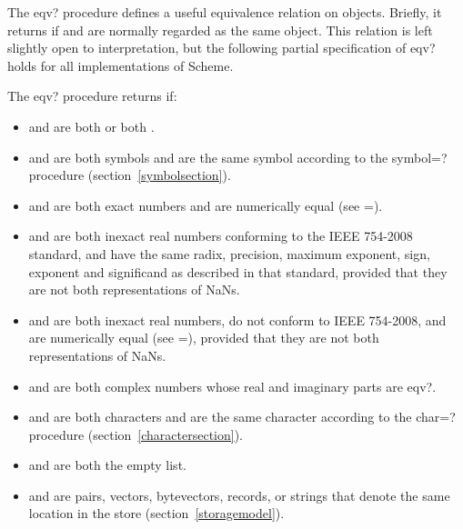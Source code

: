 \begin{entry}{%
}

The {\cf eqv?} procedure defines a useful equivalence relation on objects.
Briefly, it returns \schtrue{} if  and  are
normally regarded as the same object.  This relation is left slightly
open to interpretation, but the following partial specification of
{\cf eqv?} holds for all implementations of Scheme.

The {\cf eqv?} procedure returns \schtrue{} if:

\begin{itemize}
\item {} and  are both \schtrue{} or both \schfalse.

\item {} and  are both symbols and are the same
symbol according to the {\cf symbol=?} procedure
(section~\ref{symbolsection}).

\item {} and  are both exact numbers and
are numerically equal (see {\cf =}).

\item {} and  are both inexact real numbers
conforming to the IEEE 754-2008 standard, and have the same radix,
precision, maximum exponent, sign, exponent and significand as
described in that standard, provided that 
they are not both representations of NaNs.

\item {} and  are both inexact real numbers,
do not conform to IEEE 754-2008, and are numerically equal (see {\cf =}),
provided that they are not both representations of NaNs.

\item {} and  are both complex numbers whose
real and imaginary parts are {\cf eqv?}.

\item {} and  are both characters and are the same
character according to the {\cf char=?} procedure
(section~\ref{charactersection}).

\item {} and  are both the empty list.

\item {} and  are pairs, vectors, bytevectors, records,
or strings that denote the same location in the store
(section~\ref{storagemodel}).
\end{itemize}


\end{entry}

